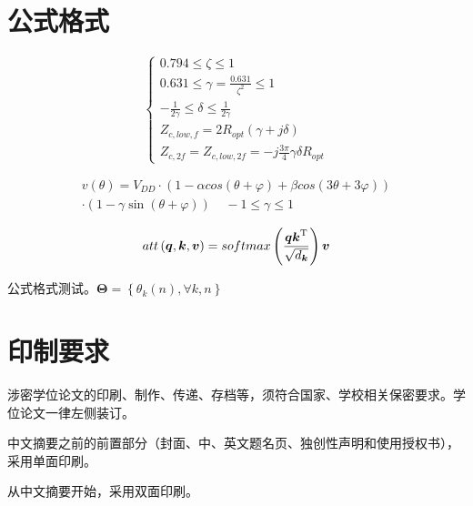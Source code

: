 \section{公式格式}

\begin{equation}
\left\{ \begin{aligned}
0.794 \le \zeta  \le 1 ~~~~~~~~~~~\\
0.631 \le \gamma  = \frac{{0.631}}{{{\zeta ^2}}} \le 1~~~~~~ \\
- \frac{1}{{2\gamma }} \le \delta  \le \frac{1}{{2\gamma }}~~~~~~~~~~~ \\
{Z_{c,low,f}} = 2{R_{opt}}(\gamma  + j\delta )~~~~~\\
{Z_{c,2f}} = {Z_{c,low,2f}} =  - j\frac{{3\pi }}{4}\gamma \delta {R_{opt}}
\end{aligned} \right.
\label{eq:3.1}
\end{equation}

\begin{equation}
\begin{aligned}
v(\theta ) = V_{DD}\cdot(1 - \alpha cos(\theta  + \varphi ) + \beta cos(3\theta  + 3\varphi ))\\
\cdot(1 - \gamma \sin (\theta  + \varphi )) ~~~~~- 1 \le \gamma  \le 1\
\end{aligned}
\label{eq:vd}
\end{equation}

\begin{equation}
\begin{aligned}
att\left( {{\bm{q}},{\bm{k}},{\bm{v}}} \right) = softmax\left( {\frac{{{\bm{qk}}^{\rm T} }}
	{{\sqrt {d_{\bm{k}} } }}} \right){\bm{v}}
\end{aligned}
\label{eq:2.12}
\end{equation}





\noindent
公式格式测试。${\mathbf{\Theta }} = \left\{ {{\theta _k}\left( n \right),\forall k,n} \right\}$

\section{印制要求}
涉密学位论文的印刷、制作、传递、存档等，须符合国家、学校相关保密要求。学位论文一律左侧装订。

中文摘要之前的前置部分（封面、中、英文题名页、独创性声明和使用授权书），采用单面印刷。

从中文摘要开始，采用双面印刷。

